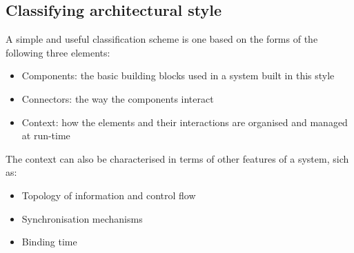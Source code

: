 \documentclass{article}[18pt]
\begin{document}
\subsection{Classifying architectural style}
A simple and useful classification scheme is one based on the forms of the following three elements:
\begin{itemize}
	\item Components: the basic building blocks used in a system built in this style
	\item Connectors: the way the components interact
	\item Context: how the elements and their interactions are organised and managed at run-time
\end{itemize}
The context can also be characterised in terms of other features of a system, sich as:
\begin{itemize}
	\item Topology of information and control flow
	\item Synchronisation mechanisms
	\item Binding time
\end{itemize}
\end{document}
